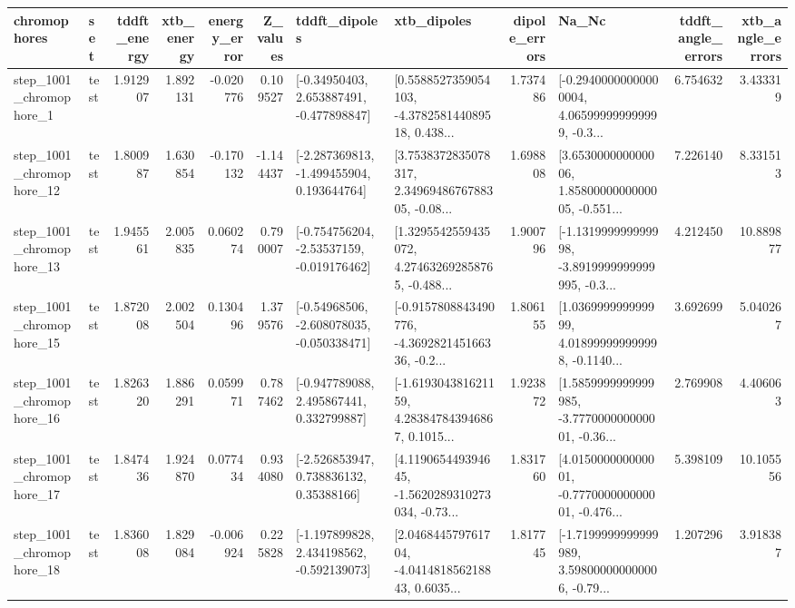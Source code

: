\begin{tabular}{llrrrrllrlrr}
\toprule
             chromophores &       set &  tddft\_energy &  xtb\_energy &  energy\_error &  Z\_values &                               tddft\_dipoles &                                        xtb\_dipoles &  dipole\_errors &                                              Na\_Nc &  tddft\_angle\_errors &  xtb\_angle\_errors \\
\midrule
  step\_1001\_chromophore\_1 &      test &      1.912907 &    1.892131 &     -0.020776 &  0.109527 &    [-0.34950403, 2.653887491, -0.477898847] &  [0.5588527359054103, -4.378258144089518, 0.438... &       1.737486 &  [-0.29400000000000004, 4.065999999999999, -0.3... &            6.754632 &          3.433319 \\
 step\_1001\_chromophore\_12 &      test &      1.800987 &    1.630854 &     -0.170132 & -1.144437 &   [-2.287369813, -1.499455904, 0.193644764] &  [3.7538372835078317, 2.3496948676788305, -0.08... &       1.698808 &  [3.653000000000006, 1.8580000000000005, -0.551... &            7.226140 &          8.331513 \\
 step\_1001\_chromophore\_13 &      test &      1.945561 &    2.005835 &      0.060274 &  0.790007 &   [-0.754756204, -2.53537159, -0.019176462] &  [1.3295542559435072, 4.274632692858765, -0.488... &       1.900796 &  [-1.131999999999998, -3.8919999999999995, -0.3... &            4.212450 &         10.889877 \\
 step\_1001\_chromophore\_15 &      test &      1.872008 &    2.002504 &      0.130496 &  1.379576 &   [-0.54968506, -2.608078035, -0.050338471] &  [-0.9157808843490776, -4.369282145166336, -0.2... &       1.806155 &  [1.036999999999999, 4.018999999999998, -0.1140... &            3.692699 &          5.040267 \\
 step\_1001\_chromophore\_16 &      test &      1.826320 &    1.886291 &      0.059971 &  0.787462 &    [-0.947789088, 2.495867441, 0.332799887] &  [-1.619304381621159, 4.283847843946867, 0.1015... &       1.923872 &  [1.5859999999999985, -3.777000000000001, -0.36... &            2.769908 &          4.406063 \\
 step\_1001\_chromophore\_17 &      test &      1.847436 &    1.924870 &      0.077434 &  0.934080 &     [-2.526853947, 0.738836132, 0.35388166] &  [4.119065449394645, -1.5620289310273034, -0.73... &       1.831760 &  [4.015000000000001, -0.777000000000001, -0.476... &            5.398109 &         10.105556 \\
 step\_1001\_chromophore\_18 &      test &      1.836008 &    1.829084 &     -0.006924 &  0.225828 &   [-1.197899828, 2.434198562, -0.592139073] &  [2.046844579761704, -4.041481856218843, 0.6035... &       1.817745 &  [-1.7199999999999989, 3.598000000000006, -0.79... &            1.207296 &          3.918387 \\

\end{tabular}
